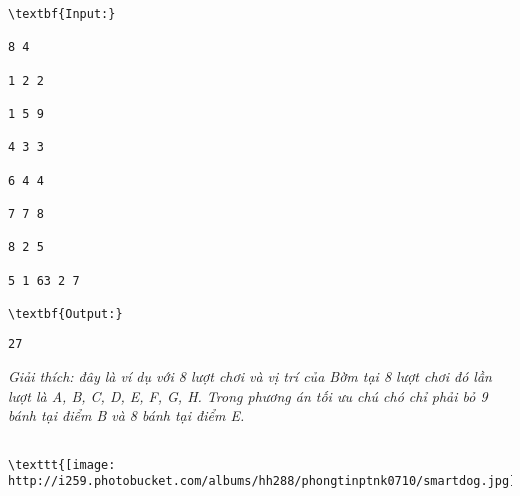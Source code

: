 \begin{verbatim}
\textbf{Input:}

8 4

1 2 2

1 5 9

4 3 3

6 4 4

7 7 8

8 2 5

5 1 63 2 7

\textbf{Output:}\end{verbatim}
\begin{verbatim}
27\end{verbatim}

\emph{    Giải thích: đây là ví dụ với 8 lượt chơi và vị trí của Bờm tại 8 lượt chơi đó lần lượt là A, B, C, D, E, F, G, H. Trong phương án tối ưu chú chó chỉ phải bỏ 9 bánh tại điểm B và 8 bánh tại điểm E.   }
\begin{verbatim}

\texttt{[image: http://i259.photobucket.com/albums/hh288/phongtinptnk0710/smartdog.jpg]}\end{verbatim}